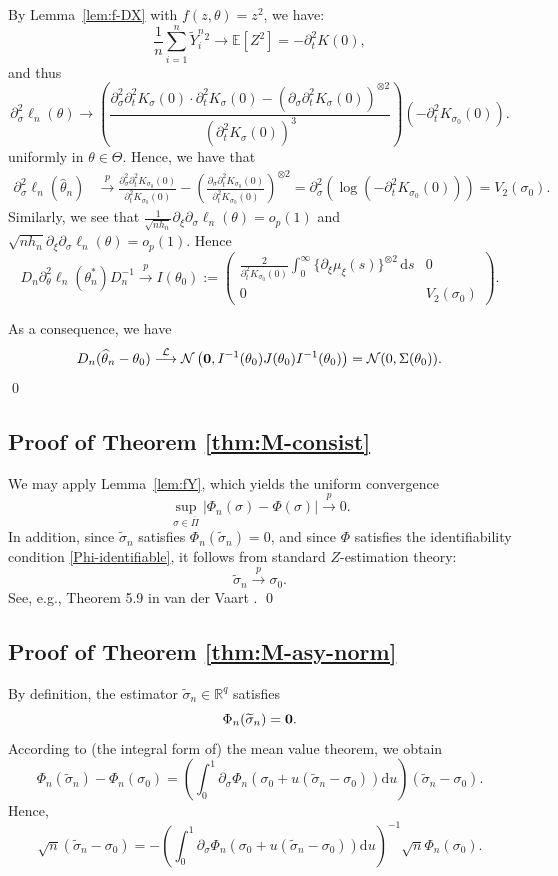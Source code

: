 \documentclass[a4paper,10pt,twoside]{article}
\numberwithin{equation}{section}
\def\dis{\displaystyle}
\def\l{\left}
\def\r{\right}
\def\th{\theta}
\def\s{\sigma}
\def\p{\partial}
\def\toP{\stackrel{p}{\longrightarrow}}
\def\toD{\stackrel{{\cal L}}{\longrightarrow}}
\def\E{\mathbb{E}}
\def\mb#1{\mbox{\boldmath $#1$}}
\def\wh#1{\widehat{#1}}
\def\wt#1{\widetilde{#1}}
\def\df{\mathrm{d}}
\begin{document}
By Lemma~\ref{lem:f-DX} with $f(z, \theta) = z^2$, we have:
\[
\frac{1}{n} \sum_{i=1}^n \widetilde{Y}_i^n{}^2 \to \E[Z^2] = -\partial_t^2 K(0),
\]
and thus
\[
\partial_\sigma^2 \ell_n(\theta)
\to 
\l( \frac{ \partial_\sigma^2 \partial_t^2 K_\sigma(0) \cdot \partial_t^2 K_\sigma(0)
- \l( \partial_\sigma \partial_t^2 K_\sigma(0) \r)^{\otimes 2} }{ \l( \partial_t^2 K_\sigma(0) \r)^3 } \r)  (-\partial_t^2 K_{\sigma_0}(0)).
\]
uniformly in $\th\in \Theta$. Hence, we have that 
\begin{align*}
\partial_\sigma^2 \ell_n(\wh{\theta}_n) &\toP 
\frac{ \partial_\sigma^2 \partial_t^2 K_{\sigma_0}(0) }{ \partial_t^2 K_{\sigma_0}(0) }
- \l( \frac{ \partial_\sigma \partial_t^2 K_{\sigma_0}(0) }{ \partial_t^2 K_{\sigma_0}(0) } \r)^{\otimes 2} 
= \p_\s^2\l(\log (-\p_t^2 K_{\s_0}(0) )\r) = V_2(\s_0). 
\end{align*}
Similarly, we see that $ \frac{1}{\sqrt{nh_n}} \p_\xi \p_\sigma \ell_n(\theta)=o_p(1)$ and $\sqrt{nh_n} \p_\xi \p_\sigma \ell_n(\theta)=o_p(1)$.  Hence 
\[
D_n \p_\theta^2 \ell_n(\theta_n^*) D_n^{-1}
\toP I(\th_0):=
\begin{pmatrix}
\dis \frac{2}{\p_t^2 K_{\sigma_0}(0)}  \int_0^\infty \{ \p_\xi \mu_\xi(s) \}^{\otimes 2}\,\df s& 0 \\
0 &V_2(\s_0)
\end{pmatrix}.
\]

As a consequence, we have 
\[
D_n (\widehat{\theta}_n - \theta_0)\toD {\cal N}\l(\mb{0}, I^{-1}(\th_0)J(\th_0) I^{-1}(\th_0)\r) = \mathcal{N}(0, \Sigma(\theta_0)). 
 \]
\qed

\subsection{Proof of Theorem \ref{thm:M-consist}}

We may apply Lemma~\ref{lem:fY}, which yields the uniform convergence
\[
\sup_{\sigma \in \overline{\Pi}} \l| \Phi_n(\sigma) - \Phi(\sigma) \r| \toP 0.
\]
In addition, since $\wt{\s}_n$ satisfies $\Phi_n(\wt{\s}_n) = 0$, and since $\Phi$ satisfies the identifiability condition \eqref{Phi-identifiable}, it follows from standard $Z$-estimation theory: 
\[
\wt{\s}_n \toP \sigma_0.
\]
See, e.g., Theorem 5.9 in van der Vaart \cite{v98}. 
\qed


\subsection{Proof of Theorem \ref{thm:M-asy-norm}}
By definition, the estimator $\wt{\s}_n \in \mathbb{R}^q$ satisfies
\[
\Phi_n(\wt{\s}_n) = \mb{0}.
\]
According to (the integral form of) the mean value theorem, we obtain
\[
\Phi_n(\wt{\s}_n) - \Phi_n(\sigma_0) 
= \l( \int_0^1 \partial_\sigma \Phi_n\l( \sigma_0 + u (\wt{\s}_n - \sigma_0) \r) \mathrm{d}u \r) (\wt{\s}_n - \sigma_0).
\]
Hence,
\[
\sqrt{n} (\wt{\s}_n - \sigma_0)
= - \l( \int_0^1 \partial_\sigma \Phi_n\l( \sigma_0 + u (\wt{\s}_n - \sigma_0) \r) \mathrm{d}u \r)^{-1} 
\sqrt{n} \Phi_n(\sigma_0).
\]
\end{document}
